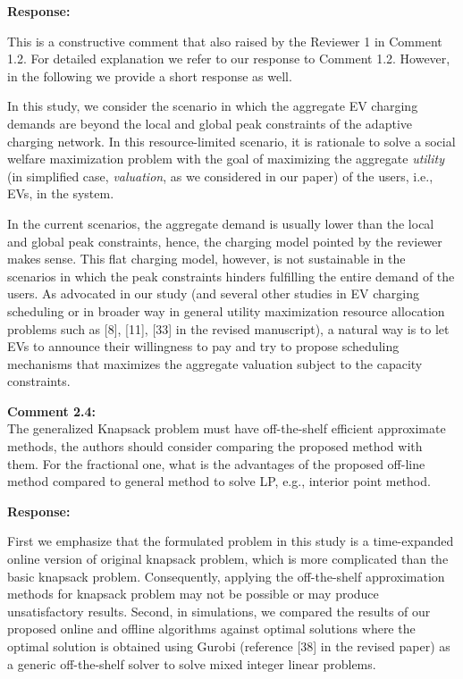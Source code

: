 \documentclass[11pt]{article}
\begin{document}
\vspace{5mm}
\noindent\textbf{Response:}

This is a constructive comment that also raised by the Reviewer 1 in Comment 1.2. For detailed explanation we refer to our response to Comment 1.2. However, in the following we provide a short response as well. 

In this study, we consider the scenario in which the aggregate EV charging demands are beyond the local and global peak constraints of the adaptive charging network.  In this resource-limited scenario, it is rationale to solve a social welfare maximization problem with the goal of maximizing the aggregate \textit{utility} (in simplified case, \textit{valuation}, as we considered in our paper) of the users, i.e., EVs, in the system. 

In the current scenarios, the aggregate demand is usually lower than the local and global peak constraints,  hence, the charging model pointed by the reviewer makes sense. This flat charging model, however, is not sustainable in the scenarios in which the peak constraints hinders fulfilling the entire demand of the users. As advocated in our study (and several other studies in EV charging scheduling or in broader way in general utility maximization resource allocation problems such as [8], [11], [33] in the revised manuscript), a natural way is to let EVs to announce their willingness to pay and try to propose scheduling mechanisms that maximizes the aggregate valuation subject to the capacity constraints.

\vspace{5mm}
{
{\color{blue}\noindent\textbf{Comment 2.4:}\\
The generalized Knapsack problem must have off-the-shelf efficient approximate methods, the authors should consider comparing the proposed method with them. For the fractional one, what is the advantages of the proposed off-line method compared to general method to solve LP, e.g., interior point method.
}}

\vspace{5mm}
\noindent\textbf{Response:}

First we emphasize that the formulated problem in this study is a time-expanded online version of original knapsack problem, which is more complicated than the basic knapsack problem. Consequently, applying the off-the-shelf approximation methods for knapsack problem may not be possible or may produce unsatisfactory results. Second, in simulations, we compared the results of our proposed online and offline algorithms against optimal solutions where the optimal solution is obtained using Gurobi (reference [38] in the revised paper) as a generic off-the-shelf solver to solve mixed integer linear problems. 
\end{document}
